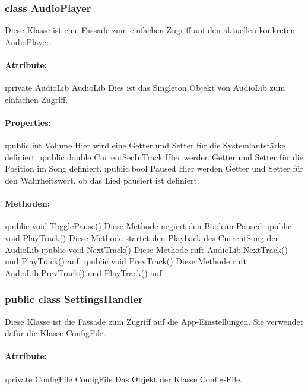 \documentclass[../entwurf.tex]{subfiles}
\begin{document}
			\subsubsection{class AudioPlayer}
				Diese Klasse ist eine Fassade zum einfachen Zugriff auf den aktuellen konkreten AudioPlayer.
				\paragraph{Attribute:}
					\begin{itemize}
						\i{private AudioLib AudioLib} Dies ist das Singleton Objekt von AudioLib zum einfachen Zugriff.
					\end{itemize}
				\paragraph{Properties:}
					\begin{itemize}
						\i{public int Volume} Hier wird eine Getter und Setter für die Systemlautstärke definiert.
						\i{public double CurrentSecInTrack} Hier werden Getter und Setter für die Position im Song definiert.
						\i{public bool Paused} Hier werden Getter und Setter für den Wahrheitswert, ob das Lied pausiert ist definiert.
					\end{itemize}
				\paragraph{Methoden:}
					\begin{itemize}
						\i{public void TogglePause()} Diese Methode negiert den Boolean Paused.
						\i{public void PlayTrack()} Diese Methode startet den Playback des CurrentSong der AudioLib
						\i{public void NextTrack()} Diese Methode ruft AudioLib.NextTrack() und PlayTrack() auf.
						\i{public void PrevTrack()} Diese Methode ruft AudioLib.PrevTrack() und PlayTrack() auf.
					\end{itemize}
			\subsubsection{public class SettingsHandler}
				Diese Klasse ist die Fassade zum Zugriff auf die App-Einstellungen. Sie verwendet dafür die Klasse ConfigFile.
				\paragraph{Attribute:}
					\begin{itemize}
						\i{private ConfigFile ConfigFile} Das Objekt der Klasse Config-File.
					\end{itemize}
\end{document}
